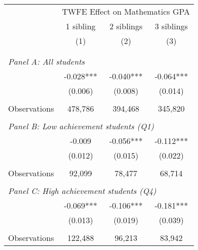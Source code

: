 \makeatletter
{}
{
\makeatother
\begin{tabular}{lccc}
\toprule
\cmidrule(lr){2-4}
& \multicolumn{3}{c}{TWFE Effect on Mathematics GPA} \\
\cmidrule(lr){2-4}
& 1 sibling & 2 siblings & 3 siblings  \\
\cmidrule(lr){2-2} \cmidrule(lr){3-3} \cmidrule(lr){4-4}
& (1) & (2) & (3)\\
\bottomrule
&  &  &  \\
&  &  &   \\
\multicolumn{4}{l}{\textit{Panel A: All students}} \\
\hspace{3mm}        &      -0.028***&      -0.040***&      -0.064***\\
                    &     (0.006)   &     (0.008)   &     (0.014)   \\
                    &               &               &               \\
\hspace{3mm}Observations&     478,786   &     394,468   &     345,820   \\
 
&  &  &   \\
\multicolumn{4}{l}{\textit{Panel B: Low achievement students (Q1)}} \\
\hspace{3mm}        &      -0.009   &      -0.056***&      -0.112***\\
                    &     (0.012)   &     (0.015)   &     (0.022)   \\
                    &               &               &               \\
\hspace{3mm}Observations&      92,099   &      78,477   &      68,714   \\
 
&  &  &   \\
\multicolumn{4}{l}{\textit{Panel C: High achievement students (Q4)}} \\
\hspace{3mm}        &      -0.069***&      -0.106***&      -0.181***\\
                    &     (0.013)   &     (0.019)   &     (0.039)   \\
                    &               &               &               \\
\hspace{3mm}Observations&     122,488   &      96,213   &      83,942   \\
 

\end{tabular}}
